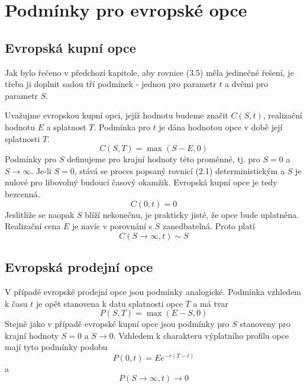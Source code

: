 \documentclass[a4paper]{book}
\begin{document}
\section{Podmínky pro evropské opce}

\subsection{Evropská kupní opce}

Jak bylo řečeno v předchozí kapitole, aby rovnice (3.5) měla jedinečné řešení, je třeba ji doplnit sadou tří podmínek - jednou pro parametr $t$ a dvěmi pro parametr $S$.

Uvažujme evropskou kupní opci, jejíž hodnotu budeme značit $C(S,t)$, realizační hodnotu $E$ a splatnost $T$. Podmínka pro $t$ je dána hodnotou opce v době její splatnosti $T$.
\begin{equation}
C(S,T) = \max(S-E,0)
\end{equation}
Podmínky pro $S$ definujeme pro krajní hodnoty této proměnné, tj. pro $S=0$ a $S \rightarrow \infty$. Je-li $S = 0$, stává se proces popsaný rovnicí (2.1) deterministickým a $S$ je nulové pro libovolný budoucí časový okamžik. Evropská kupní opce je tedy bezcenná.
\begin{equation}
C(0,t) = 0
\end{equation}
Jeslitliže se naopak $S$ blíží nekonečnu, je prakticky jisté, že opce bude uplatněna. Realizační cena $E$ je navíc v porovnání s $S$ zanedbatelná. Proto platí
\begin{equation}
C(S \rightarrow \infty,t) \sim S
\end{equation}

\subsection{Evropská prodejní opce}

V případě evropské prodejní opce jsou podmínky analogické. Podmínka vzhledem k času $t$ je opět stanovena k datu splatnosti opce $T$ a má tvar
\begin{equation}
P(S,T) = \max(E-S, 0)
\end{equation}
Stejně jako v případě evropské kupní opce jsou podmínky pro $S$ stanoveny pro krajní hodnoty $S=0$ a $S \rightarrow 0$. Vzhledem k charakteru výplatního profilu opce mají tyto podmínky podobu
\begin{equation}
P(0,t)=Ee^{-r(T-t)}
\end{equation}
a
\begin{equation}
P(S \rightarrow \infty,t) \rightarrow 0
\end{equation}
\end{document}
